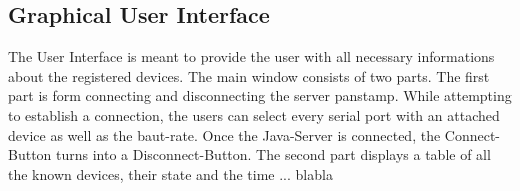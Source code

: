 \subsection{Graphical User Interface}
The User Interface is meant to provide the user with all necessary informations about the registered devices. The main window consists of two parts. 
The first part is form connecting and disconnecting the server panstamp. While attempting to establish a connection, the users can select every serial port with an attached device as well as the baut-rate. Once the Java-Server is connected, the Connect-Button turns into a Disconnect-Button.
The second part displays a table of all the known devices, their state and the time ... blabla
